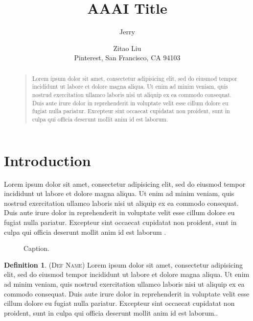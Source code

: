 \documentclass[letterpaper]{article}
\theoremstyle{definition}
\newtheorem{definition}{Definition}
\theoremstyle{theorem}
\theoremstyle{corollary}
\begin{document}
%
\title{AAAI Title}
\author{Jerry \and Zitao Liu\\
Pinterest, San Francisco, CA 94103}
\maketitle
\begin{abstract}
\begin{quote}
Lorem ipsum dolor sit amet, consectetur adipisicing elit, sed do eiusmod
tempor incididunt ut labore et dolore magna aliqua. Ut enim ad minim veniam,
quis nostrud exercitation ullamco laboris nisi ut aliquip ex ea commodo
consequat. Duis aute irure dolor in reprehenderit in voluptate velit esse
cillum dolore eu fugiat nulla pariatur. Excepteur sint occaecat cupidatat non
proident, sunt in culpa qui officia deserunt mollit anim id est laborum.
\end{quote}
\end{abstract}

\section{Introduction}
\label{sec:intro}
Lorem ipsum dolor sit amet, consectetur adipisicing elit, sed do eiusmod
 tempor incididunt ut labore et dolore magna aliqua. Ut enim ad minim veniam,
 quis nostrud exercitation ullamco laboris nisi ut aliquip ex ea commodo
 consequat. Duis aute irure dolor in reprehenderit in voluptate velit esse
 cillum dolore eu fugiat nulla pariatur. Excepteur sint occaecat cupidatat non
 proident, sunt in culpa qui officia deserunt mollit anim id est laborum \cite{liu2015regularized}. 



\begin{figure}[!tpbh]
\centering
\caption{Caption.}
\label{fig:dvi_data}
\end{figure}


\begin{definition}{(\textsc{Def Name})} 
\label{def:hts_1}
Lorem ipsum dolor sit amet, consectetur adipisicing elit, sed do eiusmod
tempor incididunt ut labore et dolore magna aliqua. Ut enim ad minim veniam,
quis nostrud exercitation ullamco laboris nisi ut aliquip ex ea commodo
consequat. Duis aute irure dolor in reprehenderit in voluptate velit esse
cillum dolore eu fugiat nulla pariatur. Excepteur sint occaecat cupidatat non
proident, sunt in culpa qui officia deserunt mollit anim id est laborum..
\end{definition}
\end{document}
